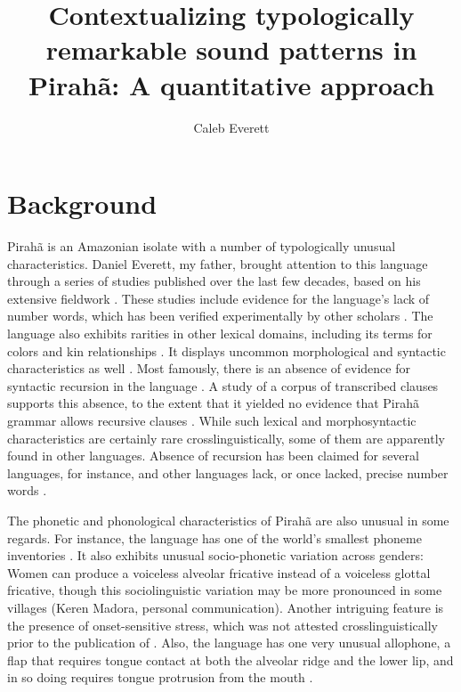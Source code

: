 \documentclass[output=paper,colorlinks,citecolor=brown
]{langscibook}
\title[Contextualizing typologically remarkable sound patterns in Pirahã]{Contextualizing typologically remarkable sound patterns in Pirahã: A quantitative approach}
\author{Caleb Everett\affiliation{University of Miami}}
\begin{document}
\maketitle
\label{chap-13_everett}

\section{Background}

Pirahã is an Amazonian isolate with a number of typologically unusual characteristics. Daniel
Everett, my father, brought attention to this language through a series of studies published over
the last few decades, based on his extensive fieldwork \citep{everett1982phonetic,
  everett1984relevance,everett1986piraha,everett2001monolingual}. These studies include evidence for
the language's lack of number words, which has been verified experimentally by other scholars
\citep{frank2008number, everett2012quantity}. The language also exhibits rarities in other lexical
domains, including its terms for colors and kin relationships \citep{everett2005cultural}. It displays uncommon morphological and syntactic characteristics as well \citep{thomason2001pronoun, everett2012language}. Most famously, there is an absence of evidence for syntactic recursion in the language \citep{everett2005cultural}. A study of a corpus of transcribed clauses supports this absence, to the extent that it yielded no evidence that Pirahã grammar allows recursive clauses \citep{futrell2016corpus}. While such lexical and morphosyntactic characteristics are certainly rare crosslinguistically, some of them are apparently found in other languages. Absence of recursion has been claimed for several languages, for instance, and other languages lack, or once lacked, precise number words \citep{pullum2020theorizing, everett2017numbers}.
    
    \begin{sloppypar}
    The phonetic and phonological characteristics of Pirahã are also unusual in some regards. For instance, the language has one of the world’s smallest phoneme inventories \citep{everett2009piraha}. It also exhibits unusual socio-phonetic variation across genders: Women can produce a voiceless alveolar fricative instead of a voiceless glottal fricative, though this sociolinguistic variation may be more pronounced in some villages (Keren Madora, personal communication). Another intriguing feature is the presence of onset-sensitive stress, which was not attested crosslinguistically prior to the publication of . Also, the language has one very unusual allophone, a flap that requires tongue contact at both the alveolar ridge and the lower lip, and in so doing requires tongue protrusion from the mouth \citep{everett1982phonetic}.
    \end{sloppypar}
    
\end{document}
